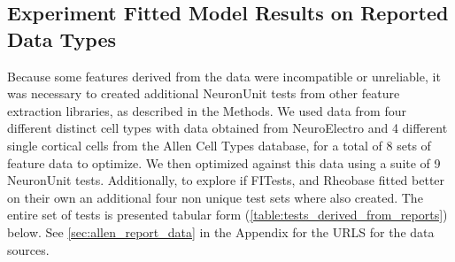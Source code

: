 




%






\subsection{Experiment Fitted Model Results on Reported Data Types} 
Because some features derived from the data were incompatible or unreliable, it was necessary to created additional NeuronUnit tests from other feature extraction libraries, as described in the Methods.
We used data from four different distinct cell types with data obtained from NeuroElectro and 4 different single cortical cells from the Allen Cell Types database, for a total of 8 sets of feature data to optimize.
We then optimized against this data using a suite of 9 NeuronUnit tests. Additionally, to explore if FITests, and Rheobase fitted better on their own an additional four non unique test sets where also created. The entire set of tests is presented tabular form (\ref{table:tests_derived_from_reports}) below. See \ref{sec:allen_report_data} in the Appendix for the URLS for the data sources.

